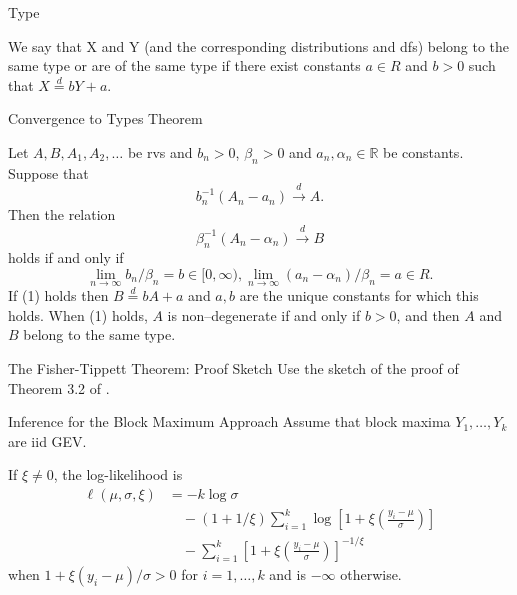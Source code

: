 \documentclass{beamer}
\begin{document}
\begin{frame}{Type}
    \begin{definition}
        We say that X and Y (and the corresponding distributions and dfs) belong to the same type or are of the same type if there exist constants $a \in R$ and $b > 0$ such that $X \overset{d}{=} b Y + a$.
    \end{definition}
\end{frame}

\begin{frame}{Convergence to Types Theorem}
    \begin{theorem}
        Let $A, B, A_1, A_2, \ldots$ be rvs and $b_n > 0$, $\beta_n > 0$ and $a_n, \alpha_n \in \mathbb{R}$ be constants. Suppose that
        \[
        b_n^{-1}(A_n - a_n) \xrightarrow{d} A.
        \]
        Then the relation
        \[
        \beta_n^{-1}(A_n - \alpha_n) \xrightarrow{d} B \tag{1}
        \]
        holds if and only if
        \[
        \lim_{n \to \infty} b_n / \beta_n = b \in [0, \infty), \lim_{n \to \infty} (a_n - \alpha_n) / \beta_n = a \in R. \tag{2}
        \]
        If (1) holds then $B \overset{d}{=} b A + a$ and $a, b$ are the unique constants for which this holds. When (1) holds, $A$ is non–degenerate if and only if $b > 0$, and then $A$ and $B$ belong to the same type.
    \end{theorem}
\end{frame}

\begin{frame}{The Fisher-Tippett Theorem: Proof Sketch}
    Use the sketch of the proof of Theorem 3.2 of \cite{coles_2001}.
\end{frame}

\begin{frame}{Inference for the Block Maximum Approach}
    Assume that block maxima $Y_1, \ldots, Y_k$ are iid GEV.

    \medskip
    
    If $\xi \ne 0$, the log-likelihood is
    \begin{align*}
        \ell(\mu, \sigma, \xi) &= -k\log\sigma \\
        &\quad - (1 + 1 / \xi)\sum_{i = 1}^k \log\left[1 + \xi\left(\frac{y_i - \mu}{\sigma}\right)\right] \\
        &\quad - \sum_{i = 1}^k \left[1 + \xi\left(\frac{y_i - \mu}{\sigma}\right)\right]^{-1 / \xi}
    \end{align*}
    when $1 + \xi(y_i - \mu) / \sigma > 0$ for $i = 1, \ldots, k$ and is $-\infty$ otherwise.
\end{frame}
\end{document}
